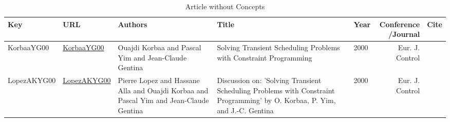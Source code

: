 {\scriptsize
\begin{longtable}{llp{5cm}p{10cm}p{3cm}rl}
\caption{Article without Concepts}\\ \toprule
Key & URL & Authors & Title & Year & \shortstack{Conference\\/Journal} & Cite\\ \midrule
\endhead
\bottomrule
\endfoot
KorbaaYG00 & \href{https://doi.org/10.1016/S0947-3580(00)71113-7}{KorbaaYG00} & Ouajdi Korbaa and Pascal Yim and Jean{-}Claude Gentina & Solving Transient Scheduling Problems with Constraint Programming & 2000 & Eur. J. Control & \cite{KorbaaYG00}\\LopezAKYG00 & \href{https://doi.org/10.1016/S0947-3580(00)71114-9}{LopezAKYG00} & Pierre Lopez and Hassane Alla and Ouajdi Korbaa and Pascal Yim and Jean{-}Claude Gentina & Discussion on: 'Solving Transient Scheduling Problems with Constraint Programming' by O. Korbaa, P. Yim, and {J.-C.} Gentina & 2000 & Eur. J. Control & \cite{LopezAKYG00}\\\end{longtable}
}

